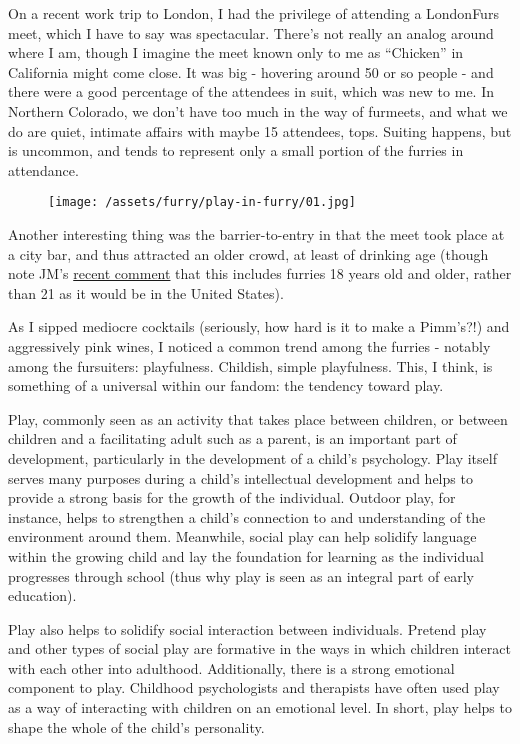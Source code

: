 On a recent work trip to London, I had the privilege of attending a
LondonFurs meet, which I have to say was spectacular. There's not really
an analog around where I am, though I imagine the meet known only to me
as ``Chicken'' in California might come close. It was big - hovering
around 50 or so people - and there were a good percentage of the
attendees in suit, which was new to me. In Northern Colorado, we don't
have too much in the way of furmeets, and what we do are quiet, intimate
affairs with maybe 15 attendees, tops. Suiting happens, but is uncommon,
and tends to represent only a small portion of the furries in
attendance.

\begin{figure}[htbp]
\centering
\texttt{[image: /assets/furry/play-in-furry/01.jpg]}
\caption{}
\end{figure}

Another interesting thing was the barrier-to-entry in that the meet took
place at a city bar, and thus attracted an older crowd, at least of
drinking age (though note JM's
\href{http://adjectivespecies.com/2014/08/18/reflections-on-an-american-furry-convention/}{recent
comment} that this includes furries 18 years old and older, rather than
21 as it would be in the United States).

As I sipped mediocre cocktails (seriously, how hard is it to make a
Pimm's?!) and aggressively pink wines, I noticed a common trend among
the furries - notably among the fursuiters: playfulness. Childish,
simple playfulness. This, I think, is something of a universal within
our fandom: the tendency toward play.

Play, commonly seen as an activity that takes place between children, or
between children and a facilitating adult such as a parent, is an
important part of development, particularly in the development of a
child's psychology. Play itself serves many purposes during a child's
intellectual development and helps to provide a strong basis for the
growth of the individual. Outdoor play, for instance, helps to
strengthen a child's connection to and understanding of the environment
around them. Meanwhile, social play can help solidify language within
the growing child and lay the foundation for learning as the individual
progresses through school (thus why play is seen as an integral part of
early education).

Play also helps to solidify social interaction between individuals.
Pretend play and other types of social play are formative in the ways in
which children interact with each other into adulthood. Additionally,
there is a strong emotional component to play. Childhood psychologists
and therapists have often used play as a way of interacting with
children on an emotional level. In short, play helps to shape the whole
of the child's personality.


